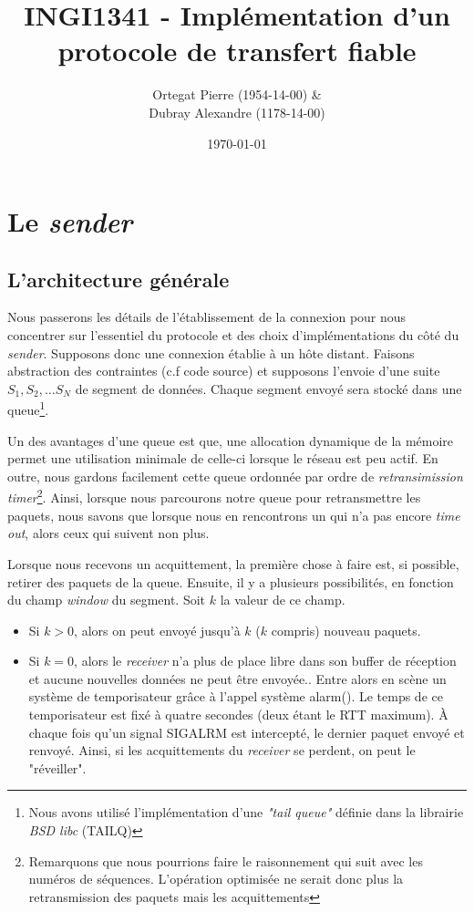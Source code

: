 \documentclass[12pt,notitlepage]{report}
\title{INGI1341 - Implémentation d'un protocole de transfert fiable}
\author{Ortegat Pierre (1954-14-00) \& \\ Dubray Alexandre (1178-14-00)}
\date{\today}
\begin{document}
\maketitle

\section{Le \textit{sender}}
	\subsection{L'architecture générale}
	Nous passerons les détails de l'établissement de la connexion pour nous concentrer sur l'essentiel du protocole et des choix d'implémentations du côté du \textit{sender}. Supposons donc une connexion établie à un hôte distant. Faisons abstraction des contraintes (c.f code source) et supposons l'envoie d'une suite $S_1 , S_2, \ldots S_N$ de segment de données. Chaque segment envoyé sera stocké dans une queue\footnote{Nous avons utilisé l'implémentation d'une \textit{"tail queue"} définie dans la librairie \textit{BSD libc} (TAILQ)}. 
	
	Un des avantages d'une queue est que, une allocation dynamique de la mémoire permet une utilisation minimale de celle-ci lorsque le réseau est peu actif.	En outre, nous gardons facilement cette queue ordonnée par ordre de \textit{retransimission timer}\footnote{Remarquons que nous pourrions faire le raisonnement qui suit avec les numéros de séquences. L'opération optimisée ne serait donc plus la retransmission des paquets mais les acquittements}. Ainsi, lorsque nous parcourons notre queue pour retransmettre les paquets, nous savons que lorsque nous en rencontrons un qui n'a pas encore \textit{time out}, alors ceux qui suivent non plus.
	
	Lorsque nous recevons un acquittement, la première chose à faire est, si possible, retirer des paquets de la queue. Ensuite, il y a plusieurs possibilités, en fonction du champ \textit{window} du segment. Soit $k$ la valeur de ce champ.
	\begin{itemize}
		\item Si $k > 0$, alors on peut envoyé jusqu'à $k$ ($k$ compris) nouveau paquets.
		\item Si $k = 0$, alors le \textit{receiver} n'a plus de place libre dans son buffer de réception et aucune nouvelles données ne peut être envoyée.. Entre alors en scène un système de temporisateur grâce à l'appel système alarm(). Le temps de ce temporisateur est fixé à quatre secondes (deux étant le RTT maximum). À chaque fois qu'un signal SIGALRM est intercepté, le dernier paquet envoyé et renvoyé. Ainsi, si les acquittements du \textit{receiver} se perdent, on peut le "réveiller".
	\end{itemize}
\end{document}
